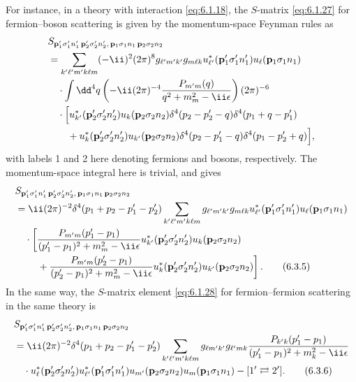 For instance, in a theory with interaction \eqref{eq:6.1.18}, the $S$-matrix \eqref{eq:6.1.27}
for fermion--boson scattering is given by the momentum-space Feynman rules as
\begin{align*}
&S_{\mathbf p'_1\sigma'_1n'_1\,\mathbf p'_2\sigma'_2n'_2,\,
\mathbf p_1\sigma_1n_1\,\mathbf p_2\sigma_2n_2}\\
&=\sum_{k'\ell'm'k\ell m}(-\ii)^2(2\pi)^8g_{\ell'm'k'}g_{m\ell k}
u_{\ell'}^*(\mathbf p'_1\sigma'_1n'_1)u_\ell(\mathbf p_1\sigma_1n_1)\\
&\quad\cdot\int \dd^4q\left(-\ii(2\pi)^{-4}
\frac{P_{m'm}(q)}{q^2+m_m^2-\ii\epsilon}\right)(2\pi)^{-6}\\
&\quad\cdot\Bigl[
u_{k'}^*(\mathbf p'_2\sigma'_2n'_2)u_k(\mathbf p_2\sigma_2n_2)
\delta^4(p_2-p'_2-q)\delta^4(p_1+q-p'_1)\\
&\qquad{}+u_k^*(\mathbf p'_2\sigma'_2n'_2)u_{k'}(\mathbf p_2\sigma_2n_2)
\delta^4(p_2-p'_1-q)\delta^4(p_1-p'_2+q)\Bigr],
\end{align*}
with labels 1 and 2 here denoting fermions and bosons, respectively. The
momentum-space integral here is trivial, and gives
\begin{align}
&S_{\mathbf p'_1\sigma'_1n'_1\,\mathbf p'_2\sigma'_2n'_2,\,
\mathbf p_1\sigma_1n_1\,\mathbf p_2\sigma_2n_2}\notag\\
&=\ii(2\pi)^{-2}\delta^4(p_1+p_2-p'_1-p'_2)
\sum_{k'\ell'm'k\ell m}g_{\ell'm'k'}g_{m\ell k}
u_{\ell'}^*(\mathbf p'_1\sigma'_1n'_1)u_\ell(\mathbf p_1\sigma_1n_1)
\notag\\
&\quad\cdot\left[
\frac{P_{m'm}(p'_1-p_1)}{(p'_1-p_1)^2+m_m^2-\ii\epsilon}
u_{k'}^*(\mathbf p'_2\sigma'_2n'_2)u_k(\mathbf p_2\sigma_2n_2)\right.
\notag\\
&\qquad\left.{}+
\frac{P_{m'm}(p'_2-p_1)}{(p'_2-p_1)^2+m_m^2-\ii\epsilon}
u_k^*(\mathbf p'_2\sigma'_2n'_2)u_{k'}(\mathbf p_2\sigma_2n_2)
\right].
\tag{6.3.5}
\label{eq:6.3.5}
\end{align}
In the same way, the $S$-matrix element \eqref{eq:6.1.28} for fermion--fermion
scattering in the same theory is
\begin{align}
&S_{\mathbf p'_1\sigma'_1n'_1\,\mathbf p'_2\sigma'_2n'_2,\,
\mathbf p_1\sigma_1n_1\,\mathbf p_2\sigma_2n_2}\notag\\
&=\ii(2\pi)^{-2}\delta^4(p_1+p_2-p'_1-p'_2)
\sum_{k'\ell'm'k\ell m}g_{\ell m'k'}g_{\ell'mk}
\frac{P_{k'k}(p'_1-p_1)}{(p'_1-p_1)^2+m_k^2-\ii\epsilon}
\notag\\
&\quad\cdot u_\ell^*(\mathbf p'_2\sigma'_2n'_2)
u_{\ell'}^*(\mathbf p'_1\sigma'_1n'_1)
u_{m'}(\mathbf p_2\sigma_2n_2)u_m(\mathbf p_1\sigma_1n_1)
-[1'\rightleftarrows2'].
\tag{6.3.6}
\label{eq:6.3.6}
\end{align}
